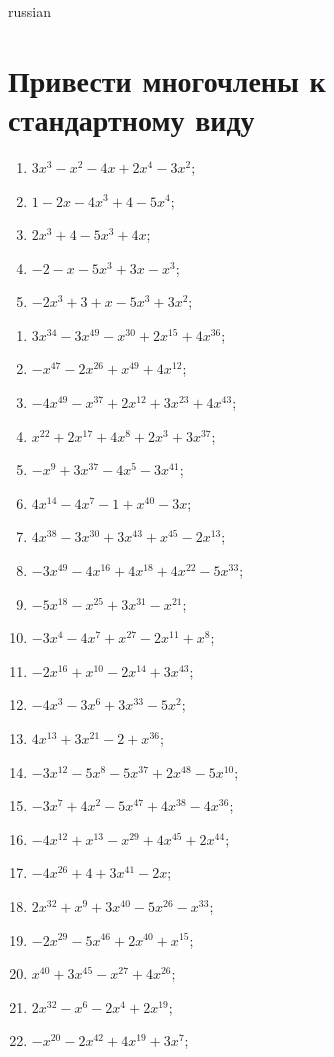\documentclass[a4paper]{article}
\begin{document}
\begin{otherlanguage*}{russian}

\section{Привести многочлены к стандартному виду}
\begin{enumerate}
\item $3x^3 - x^2 - 4x + 2x^4 - 3x^2$;
\item $1 - 2x - 4x^3 + 4 - 5x^4$;
\item $2x^3 + 4 - 5x^3 + 4x$;
\item $-2 - x - 5x^3 + 3x - x^3$;
\item $-2x^3 + 3 + x - 5x^3 + 3x^2$;
\end{enumerate}
\begin{enumerate}
\item $3x^34 - 3x^49 - x^30 + 2x^15 + 4x^36$;
\item $-x^47 - 2x^26 + x^49 + 4x^12$;
\item $-4x^49 - x^37 + 2x^12 + 3x^23 + 4x^43$;
\item $x^22 + 2x^17 + 4x^8 + 2x^3 + 3x^37$;
\item $-x^9 + 3x^37 - 4x^5 - 3x^41$;
\item $4x^14 - 4x^7 - 1 + x^40 - 3x$;
\item $4x^38 - 3x^30 + 3x^43 + x^45 - 2x^13$;
\item $-3x^49 - 4x^16 + 4x^18 + 4x^22 - 5x^33$;
\item $-5x^18 - x^25 + 3x^31 - x^21$;
\item $-3x^4 - 4x^7 + x^27 - 2x^11 + x^8$;
\item $-2x^16 + x^10 - 2x^14 + 3x^43$;
\item $-4x^3 - 3x^6 + 3x^33 - 5x^2$;
\item $4x^13 + 3x^21 - 2 + x^36$;
\item $-3x^12 - 5x^8 - 5x^37 + 2x^48 - 5x^10$;
\item $-3x^7 + 4x^2 - 5x^47 + 4x^38 - 4x^36$;
\item $-4x^12 + x^13 - x^29 + 4x^45 + 2x^44$;
\item $-4x^26 + 4 + 3x^41 - 2x$;
\item $2x^32 + x^9 + 3x^40 - 5x^26 - x^33$;
\item $-2x^29 - 5x^46 + 2x^40 + x^15$;
\item $x^40 + 3x^45 - x^27 + 4x^26$;
\item $2x^32 - x^6 - 2x^4 + 2x^19$;
\item $-x^20 - 2x^42 + 4x^19 + 3x^7$;

\end{enumerate}
\end{otherlanguage*}
\end{document}
